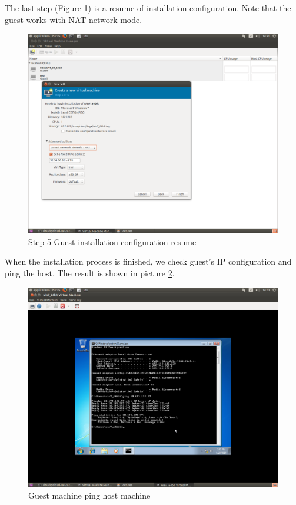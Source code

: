 The last step (Figure \ref {fig:Step 5-Guest installation configuration resume}) is a resume of installation configuration. Note that the guest works with NAT network mode.
\begin{figure}[htbp]
	\centering
		\includegraphics[scale=0.4]{Figures/Figure16.png}
	\caption[Step 5-Guest installation configuration resume]{Step 5-Guest installation configuration resume}
	\label{fig:Step 5-Guest installation configuration resume}
\end{figure}

When the installation process is finished, we check guest’s IP configuration and ping the host. The result is shown in picture \ref{fig:guest machine ping host machine}.
\begin{figure}[htbp]
	\centering
		\includegraphics[scale=0.4]{Figures/Figure17.png}
	\caption[Guest machine ping host machine]{Guest machine ping host machine}
	\label{fig:guest machine ping host machine}
\end{figure}

